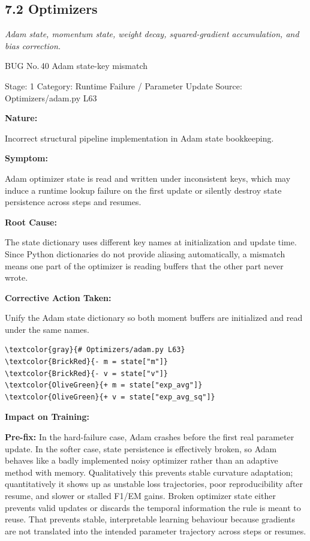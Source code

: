 \documentclass[10pt]{article}
\newcommand{\ReportSubsection}[1]{%
 \Needspace{24\baselineskip}%
 \phantomsection
 \subsection*{#1}%
 \addcontentsline{toc}{subsection}{#1}%
 \vspace{-0.12em}%
}
\newcommand{\FieldLabel}[1]{%
 {\bfseries #1:}\par
}
\begin{document}
\ReportSubsection{7.2 Optimizers}

{\itshape
Adam state, momentum state, weight decay, squared-gradient accumulation, and bias correction.
\par}

\begin{bugbox}{BUG No.\,40 \quad Adam state-key mismatch}
{\color{MetaGray}\small Stage: 1 \;\textbar\; Category: Runtime Failure / Parameter Update \;\textbar\; Source: Optimizers/adam.py L63\par}
\vspace{0.22em}
\FieldLabel{Nature}
Incorrect structural pipeline implementation in Adam state bookkeeping.
\par
\vspace{0.35em}
\FieldLabel{Symptom}
Adam optimizer state is read and written under inconsistent keys, which may induce a runtime lookup failure on the first update or silently destroy state persistence across steps and resumes.
\par
\vspace{0.35em}
\FieldLabel{Root Cause}
The state dictionary uses different key names at initialization and update time. Since Python dictionaries do not provide aliasing automatically, a mismatch means one part of the optimizer is reading buffers that the other part never wrote.
\par
\vspace{0.35em}
\FieldLabel{Corrective Action Taken}
Unify the Adam state dictionary so both moment buffers are initialized and read under the same names.
\par
\vspace{0.35em}
\begin{Verbatim}[commandchars=\\\{\},fontsize=\footnotesize,breaklines=true,breaksymbol={},frame=leftline,framerule=2pt,rulecolor=\color{gray!40},xleftmargin=6pt,formatcom=\singlespacing]
\textcolor{gray}{# Optimizers/adam.py L63}
\textcolor{BrickRed}{- m = state["m"]}
\textcolor{BrickRed}{- v = state["v"]}
\textcolor{OliveGreen}{+ m = state["exp_avg"]}
\textcolor{OliveGreen}{+ v = state["exp_avg_sq"]}
\end{Verbatim}
\vspace{0.22em}
\FieldLabel{Impact on Training}
\textbf{Pre-fix:} In the hard-failure case, Adam crashes before the first real parameter update. In the softer case, state persistence is effectively broken, so Adam behaves like a badly implemented noisy optimizer rather than an adaptive method with memory. Qualitatively this prevents stable curvature adaptation; quantitatively it shows up as unstable loss trajectories, poor reproducibility after resume, and slower or stalled F1/EM gains. Broken optimizer state either prevents valid updates or discards the temporal information the rule is meant to reuse. That prevents stable, interpretable learning behaviour because gradients are not translated into the intended parameter trajectory across steps or resumes.\par\smallskip

\end{bugbox}
\end{document}
